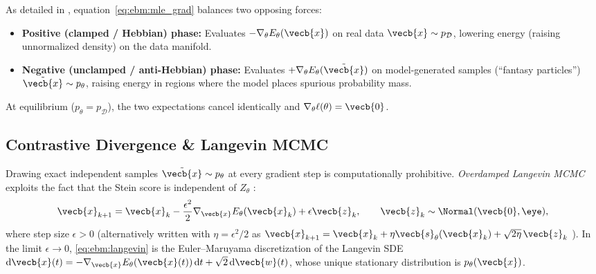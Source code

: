\documentclass[../../../../master.tex]{subfiles}
\begin{document}
\begin{intuition}
As detailed in , equation~\eqref{eq:ebm:mle_grad} balances two opposing forces:
\begin{itemize}
  \item \textbf{Positive (clamped / Hebbian) phase:} Evaluates $-\nabla_\theta E_\theta(\vecb{x})$ on real data $\vecb{x} \sim p_{\mathcal{D}}$, lowering energy (raising unnormalized density) on the data manifold.
  \item \textbf{Negative (unclamped / anti-Hebbian) phase:} Evaluates $+\nabla_\theta E_\theta(\tilde{\vecb{x}})$ on model-generated samples (``fantasy particles'') $\tilde{\vecb{x}} \sim p_\theta$, raising energy in regions where the model places spurious probability mass.
\end{itemize}
At equilibrium ($p_\theta = p_{\mathcal{D}}$), the two expectations cancel identically and $\nabla_\theta \ell(\theta) = \vecb{0}$.
\end{intuition}


\subsection{Contrastive Divergence \& Langevin MCMC}
\label{sec:ebm:cd}

Drawing exact independent samples $\tilde{\vecb{x}} \sim p_\theta$ at every gradient step is computationally prohibitive. \emph{Overdamped Langevin MCMC} exploits the fact that the Stein score is independent of $Z_\theta$ :
\begin{equation}
  \vecb{x}_{k+1} = \vecb{x}_k - \frac{\epsilon^2}{2}\nabla_{\vecb{x}} E_\theta(\vecb{x}_k) + \epsilon \vecb{z}_k, \qquad \vecb{z}_k \sim \Normal(\vecb{0}, \eye),
  \label{eq:ebm:langevin}
\end{equation}
where step size $\epsilon > 0$ (alternatively written with $\eta = \epsilon^2/2$ as $\vecb{x}_{k+1} = \vecb{x}_k + \eta \vecb{s}_\theta(\vecb{x}_k) + \sqrt{2\eta}\,\vecb{z}_k$ ). In the limit $\epsilon \to 0$, \eqref{eq:ebm:langevin} is the Euler--Maruyama discretization of the Langevin SDE $\mathrm{d}\vecb{x}(t) = -\nabla_{\vecb{x}} E_\theta(\vecb{x}(t))\,\mathrm{d}t + \sqrt{2}\,\mathrm{d}\vecb{w}(t)$, whose unique stationary distribution is $p_\theta(\vecb{x})$.
\end{document}
